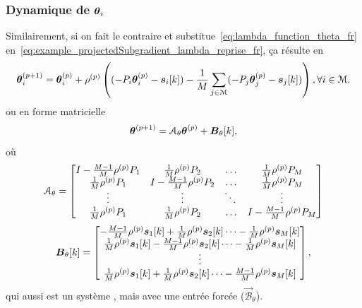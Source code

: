 \documentclass[../main.tex]{subfiles}
\begin{document}
\subsubsection{Dynamique de $\boldsymbol{\theta}_{i}$}
Similairement, si on fait le contraire et substitue~\eqref{eq:lambda_function_theta_fr} en~\eqref{eq:example_projectedSubgradient_lambda_reprise_fr},
ça résulte en
\begin{equation}
  \label{eq:negotiation_equation_substituting_fr}
 \thetai\pplusone=\thetai\p+\rho\p\left((-\Plin\thetai\p-\sik)-\frac{1}{M}\sum_{j\in\set{M}}(-\Plin[j]\vec{\theta}_{j}\p-\vec{s}_{j}[k])\right),\forall i\in\set{M}.
\end{equation}
ou en forme matricielle
\begin{equation}
  \label{eq:negotiation_equation_substituting_organizing_matrix_theta_fr}
  \vec{\theta}\pplusone=\mathcal{A}_{\theta}\vec{\theta}\p+\mathcal{\vec{B}}_{\theta}[k],
\end{equation}
où
\begin{equation}
\mathcal{A}_{\theta}=\left[
\begin{matrix}
I-\frac{M-1}{M}\rho\p \Plin[1] & \frac{1}{M}\rho\p \Plin[2]&\dots&\frac{1}{M}\rho\p \Plin[M]\\
\frac{1}{M}\rho\p \Plin[1]&I-\frac{M-1}{M}\rho\p \Plin[2]&\dots&\frac{1}{M}\rho\p \Plin[M]\\
\vdots&\vdots&\ddots&\vdots\\
\frac{1}{M}\rho\p \Plin[1]&\frac{1}{M}\rho\p \Plin[2]&\dots&I-\frac{M-1}{M}\rho\p \Plin[M]\\
\end{matrix}
\right]
\end{equation}
\begin{equation}
\mathcal{\vec{B}}_{\theta}[k]=\left[
\begin{matrix}
-\frac{M-1}{M}\rho\p \vec{s}_{1}[k]+\frac{1}{M}\rho\p \vec{s}_{2}[k]\dots-\frac{1}{M}\rho\p \vec{s}_{M}[k]\\
\frac{1}{M}\rho\p \vec{s}_{1}[k]-\frac{M-1}{M}\rho\p \vec{s}_{2}[k] \dots-\frac{1}{M}\rho\p \vec{s}_{M}[k]\\
\vdots\\
\frac{1}{M}\rho\p \vec{s}_{1}[k]+\frac{1}{M}\rho\p \vec{s}_{2}[k]\dots-\frac{M-1}{M}\rho\p \vec{s}_{M}[k]\\
\end{matrix}
\right],
\end{equation}
qui aussi est un système \dt{}, mais avec une entrée forcée ($\mathcal{\vec{B}}_{\theta}$).
\end{document}
